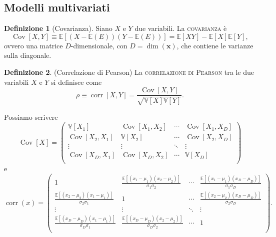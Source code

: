 \documentclass[10pt]{article}
\DeclareMathOperator{\Cov}{Cov}
\DeclareMathOperator{\corr}{corr}
\renewcommand{\vec}[1]{\boldsymbol{#1}}
\newcommand{\im}[1]{\textsc{#1}}
\newcommand{\pare}[1]{
	\ensuremath{\left(#1\right)}
}
\newcommand{\spare}[1]{
	\ensuremath{\left[#1\right]}
}
\theoremstyle{definition}
\newtheorem{definition}{Definizione}[section]
\begin{document}
\subsection{Modelli multivariati}
\begin{definition}[Covarianza]
Siano $X$ e $Y$ due variabili. La \im{covarianza} è
\begin{equation}
\Cov\spare{X, Y} \equiv \mathbb{E}\spare{\pare{X - \mathbb{E}\pare{E}}\pare{Y - \mathbb{E}\pare{E}}} = \mathbb{E}\spare{XY} - \mathbb{E}\spare{X}\mathbb{E}\spare{Y},
\end{equation}
ovvero una matrice $D$-dimensionale, con $D = \dim\pare{\vec{x}}$, che contiene le varianze sulla diagonale.
\end{definition}

\begin{definition}(Correlazione di Pearson)
La \im{correlazione di Pearson} tra le due variabili $X$ e $Y$ si definisce come
\begin{equation}
\rho \equiv \corr\spare{X, Y} = \frac{\Cov\spare{X, Y}}{\sqrt{\mathbb{V}\spare{X}\mathbb{V}\spare{Y}}}.
\end{equation}
\end{definition}

Possiamo scrivere
\begin{equation}
\Cov\spare{X} = \pare{\begin{array}{cccc}
\mathbb{V}\spare{X_1} & \Cov\spare{X_1, X_2} & \cdots & \Cov\spare{X_1, X_D} \\
\Cov\spare{X_2, X_1} & \mathbb{V}\spare{X_2} & \cdots & \Cov\spare{X_2, X_D} \\
\vdots & \vdots & \ddots & \vdots \\
\Cov\spare{X_D, X_1} & \Cov\spare{X_D, X_2} & \cdots & \mathbb{V}\spare{X_D} \\
\end{array}}
\end{equation}
e
\begin{equation}
\corr\pare{x} = \pare{\begin{array}{cccc}
1 & \frac{\mathbb{E}\spare{\pare{x_1-\mu_1}\pare{x_2-\mu_2}}}{\sigma_1\sigma_2} & \cdots & \frac{\mathbb{E}\spare{\pare{x_1-\mu_1}\pare{x_D-\mu_D}}}{\sigma_1\sigma_D} \\
\frac{\mathbb{E}\spare{\pare{x_2-\mu_2}\pare{x_1-\mu_1}}}{\sigma_2\sigma_1} & 1 & \cdots & \frac{\mathbb{E}\spare{\pare{x_2-\mu_2}\pare{x_D-\mu_D}}}{\sigma_2\sigma_D} \\
\vdots & \vdots & \ddots & \vdots \\
\frac{\mathbb{E}\spare{\pare{x_D-\mu_D}\pare{x_1-\mu_1}}}{\sigma_D\sigma_1} & \frac{\mathbb{E}\spare{\pare{x_D-\mu_D}\pare{x_2-\mu_2}}}{\sigma_D\sigma_2} & \cdots & 1 \\
\end{array}}.
\end{equation}
\end{document}
